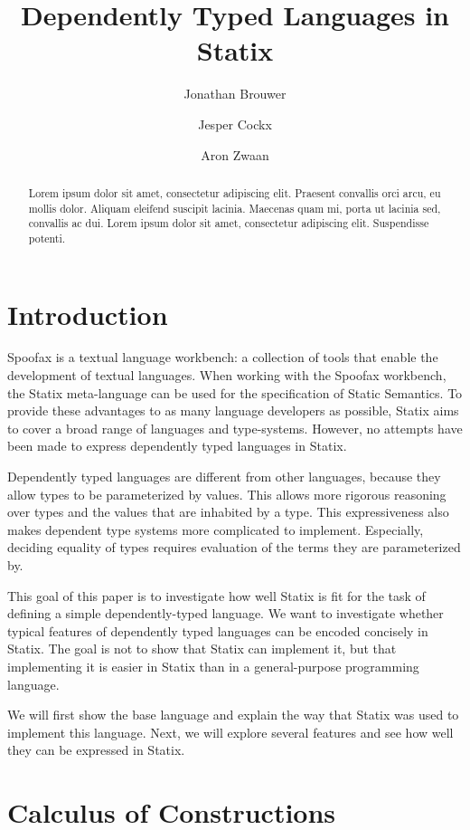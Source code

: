 \documentclass[a4paper,UKenglish,cleveref, autoref, thm-restate]{oasics-v2021}
\title{Dependently Typed Languages in Statix} %
\author{Jonathan Brouwer}{Delft University of Technology, The Netherlands \and \url{http://jonathanb.nl}}{j.t.brouwer@student.tudelft.nl}{}{}
\author{Jesper Cockx}{Delft University of Technology, The Netherlands \and \url{http://jesper.sikanda.be}}{j.g.h.cockx@tudelft.nl}{}{}
\author{Aron Zwaan}{Delft University of Technology, The Netherlands \and \url{http://aronzwaan.github.io}}{a.s.zwaan@tudelft.nl}{}{}
\begin{document}
\maketitle

\begin{abstract}
Lorem ipsum dolor sit amet, consectetur adipiscing elit. Praesent convallis orci arcu, eu mollis dolor. Aliquam eleifend suscipit lacinia. Maecenas quam mi, porta ut lacinia sed, convallis ac dui. Lorem ipsum dolor sit amet, consectetur adipiscing elit. Suspendisse potenti. 
\end{abstract}

\section{Introduction}

Spoofax is a textual language workbench: \label{key}a collection of tools that enable the development of textual languages\cite{spoofax}. When working with the Spoofax workbench, the Statix meta-language can be used for the specification of Static Semantics. To provide these advantages to as many language developers as possible, Statix aims to cover a broad range of languages and type-systems. However, no attempts have been made to express dependently typed languages in Statix. 

Dependently typed languages are different from other languages, because they allow types to be parameterized by values. This allows more rigorous reasoning over types and the values that are inhabited by a type. This expressiveness also makes dependent type systems more complicated to implement. Especially, deciding equality of types requires evaluation of the terms they are parameterized by. 

This goal of this paper is to investigate how well Statix is fit for the task of defining a simple dependently-typed language. We want to investigate whether typical features of dependently typed languages can be encoded concisely in Statix. The goal is not to show that Statix can implement it, but that implementing it is easier in Statix than in a general-purpose programming language. 

We will first show the base language and explain the way that Statix was used to implement this language. Next, we will explore several features and see how well they can be expressed in Statix.

\section{Calculus of Constructions}
\end{document}
